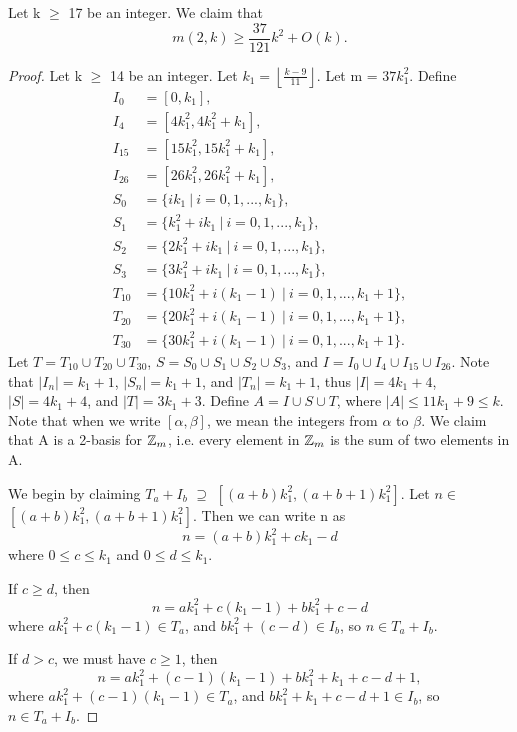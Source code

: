 \begin{theorem}
Let k $\geq$ 17 be an integer. We claim that
 \[
m(2,k) \geq \frac{37}{121}k^2 + O(k). 
\]
\end{theorem}
\begin{proof}
Let k $\geq$ 14 be an integer. Let $k_1 = \left \lfloor \frac{k - 9}{11} \right \rfloor$. Let m = $37k_1^2$.  Define 
\begin{align*}
I_0 &= [0, k_1], \\
I_4 &= [4k_1^2, 4k_1^2+k_1], \\
I_{15} &= [15k_1^2, 15k_1^2+k_1],\\
I_{26} &= [26k_1^2, 26k_1^2+k_1], \\
S_0 &= \{ik_1 \ |\  i = 0 , 1, ... , k_1\},\\
S_1 &= \{k_1^2 + ik_1 \ |\  i = 0 , 1, ... , k_1\},\\
S_2 &= \{2k_1^2 + ik_1 \ |\  i = 0 , 1, ... , k_1\}, \\
S_3 &= \{3k_1^2 +ik_1 \ |\   i = 0 , 1, ... , k_1\}, \\
T_{10} &= \{10k_1^2+ i(k_1 - 1) \ |\   i = 0 , 1, ... , k_1 + 1\},\\
T_{20} &= \{20k_1^2 + i(k_1 - 1) \ |\  i = 0 , 1, ... , k_1 + 1\}, \\
T_{30} &= \{30k_1^2 + i(k_1 - 1) \ |\  i = 0 , 1, ... , k_1 + 1\}.
\end{align*}
Let $T = T_{10} \cup T_{20} \cup T_{30}$, $S = S_{0} \cup S_{1} \cup S_{2} \cup S_{3}$, and $I = I_{0} \cup I_{4} \cup I_{15} \cup I_{26}.$ Note that $|I_n| = k_1 + 1$, $|S_n| = k_1 + 1$, and $|T_n| = k_1 + 1$, thus $|I| = 4k_1 + 4$, $|S| = 4k_1 + 4$, and $|T| = 3k_1 + 3$. Define $A = I \cup S \cup T$, where $|A| \leq 11k_1 + 9 \leq k$. Note that when we write $[\alpha, \beta]$, we mean the integers from $\alpha$ to $\beta$. We claim that A is a 2-basis for $\mbox{$\mathbb Z$}_m$, i.e. every element in $\mbox{$\mathbb Z$}_m$ is the sum of two elements in A.

We begin by claiming $T_a + I_b$ $\supseteq$ $[(a + b)k_1^2 ,  (a + b + 1)k_1^2]$. Let $n \in$ $[(a + b)k_1^2 ,  (a + b + 1)k_1^2]$.
Then we can write n as 
\[
n = (a + b) k_1^2 + ck_1 - d
\]
where $0 \leq c \leq k_1$ and $0 \leq d \leq k_1$.

If $c \geq d$, then
\[
n = ak_1^2 + c(k_1- 1) + bk_1^2 +  c - d
\]
where $ak_1^2 +c(k_1- 1) \in T_a$, and $bk_1^2 + (c - d) \in I_b$, so $n \in T_a + I_b$. 

If $d>c$, we must have $c \geq 1$, then
\[
n = ak_1^2 + (c - 1)(k_1 - 1) + bk_1^2 + k_1 +c - d + 1, 
\]
where $ak_1^2 + (c - 1)(k_1 - 1) \in T_a$, and $bk_1^2 + k_1 + c - d + 1 \in I_b$, so $n \in T_a + I_b$. 


\end{proof}
